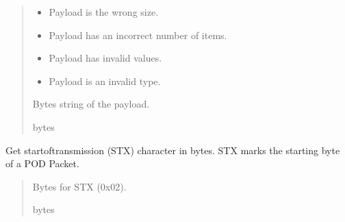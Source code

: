 \documentclass[letterpaper,10pt,english]{sphinxmanual}
\begin{document}
\begin{fulllineitems}
\begin{fulllineitems}
\begin{quote}
\begin{description}
\begin{itemize}
\item {} 
\sphinxAtStartPar
{} \textendash{} Payload is the wrong size.

\item {} 
\sphinxAtStartPar
{} \textendash{} Payload has an incorrect number of items.

\item {} 
\sphinxAtStartPar
{} \textendash{} Payload has invalid values.

\item {} 
\sphinxAtStartPar
{} \textendash{} Payload is an invalid type.

\end{itemize}

\sphinxAtStartPar
Bytes string of the payload.

\sphinxAtStartPar
bytes

\end{description}\end{quote}

\end{fulllineitems}


\begin{fulllineitems}
\label{\detokenize{PodPacketHandling:PodPacketHandling.POD_Packets.STX}}
\pysigstartsignatures
{}
\pysigstopsignatures
\sphinxAtStartPar
Get start\sphinxhyphen{}of\sphinxhyphen{}transmission (STX) character in bytes. STX marks the starting byte of a POD Packet.
\begin{quote}\begin{description}
\sphinxAtStartPar
Bytes for STX (0x02).

\sphinxAtStartPar
bytes

\end{description}\end{quote}

\end{fulllineitems}



\end{fulllineitems}
\end{document}
